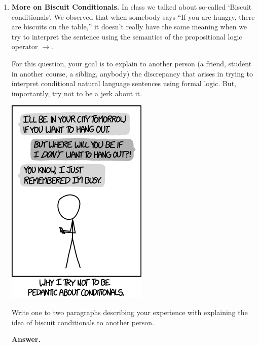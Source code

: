 \documentclass[12pt]{article}
\newenvironment{problem}[2][Problem]{\begin{trivlist}
\item[\hskip \labelsep {\bfseries #1}\hskip \labelsep {\bfseries #2.}]}{\end{trivlist}}
\begin{document}
\begin{problem}{1}
\begin{enumerate}[label=\Alph*.]
\begin{enumerate}[label=\roman*.]
\end{enumerate}


\newpage
\item \textbf{More on Biscuit Conditionals.} In class we talked about so-called `Biscuit conditionals'. We observed that when somebody says ``If you are hungry, there are biscuits on the table,'' it doesn't really have the same meaning when we try to interpret the sentence using the semantics of the propositional logic operator $\rightarrow$.

For this question, your goal is to explain to another person (a friend, student in another course, a sibling, anybody) the discrepancy that arises in trying to interpret conditional natural language sentences using formal logic. But, importantly, try not to be a jerk about it.

\begin{center}
\includegraphics[scale=0.7]{conditionals.png}
\end{center}

Write one to two paragraphs describing your experience with explaining the idea of biscuit conditionals to another person.

\textbf{Answer.} 


\end{enumerate}
\end{problem}
\end{document}
